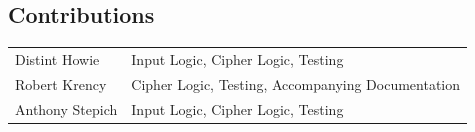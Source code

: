 \documentclass{article}
\begin{document}
\pagebreak
\subsection*{Contributions}

\begin{tabular}{l l}
    Distint Howie & Input Logic, Cipher Logic, Testing \\
    Robert Krency & Cipher Logic, Testing, Accompanying Documentation \\
    Anthony Stepich & Input Logic, Cipher Logic, Testing
\end{tabular}
\end{document}
